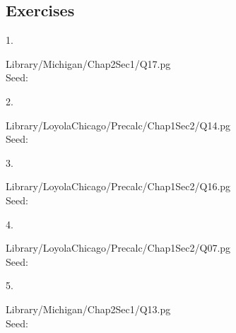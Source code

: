 \documentclass[10pt,]{book}
\theoremstyle{plain}
\theoremstyle{definition}
\theoremstyle{definition}
\theoremstyle{definition}
\theoremstyle{definition}
\theoremstyle{definition}
\numberwithin{equation}{section}
\begin{document}
\subsection[{Exercises}]{Exercises}\label{ez-1-1}
\begin{exerciselist}
\item[1.]\hypertarget{ez-1-1-WW1}{}\mbox{}\\ %
\begin{mdframed}
{}\par\vspace*{2ex}%
{\tiny\ttfamily\noindent
Library/Michigan/Chap2Sec1/Q17.pg\\Seed: \hfill}\end{mdframed}
\item[2.]\hypertarget{ez-1-1-WW2}{}\mbox{}\\ %
\begin{mdframed}
{}\par\vspace*{2ex}%
{\tiny\ttfamily\noindent
Library/LoyolaChicago/Precalc/Chap1Sec2/Q14.pg\\Seed: \hfill}\end{mdframed}
\item[3.]\hypertarget{ez-1-1-WW3}{}\mbox{}\\ %
\begin{mdframed}
{}\par\vspace*{2ex}%
{\tiny\ttfamily\noindent
Library/LoyolaChicago/Precalc/Chap1Sec2/Q16.pg\\Seed: \hfill}\end{mdframed}
\item[4.]\hypertarget{ez-1-1-WW4}{}\mbox{}\\ %
\begin{mdframed}
{}\par\vspace*{2ex}%
{\tiny\ttfamily\noindent
Library/LoyolaChicago/Precalc/Chap1Sec2/Q07.pg\\Seed: \hfill}\end{mdframed}
\item[5.]\hypertarget{ez-1-1-WW5}{}\mbox{}\\ %
\begin{mdframed}
{}\par\vspace*{2ex}%
{\tiny\ttfamily\noindent
Library/Michigan/Chap2Sec1/Q13.pg\\Seed: \hfill}\end{mdframed}

\end{exerciselist}
\end{document}
